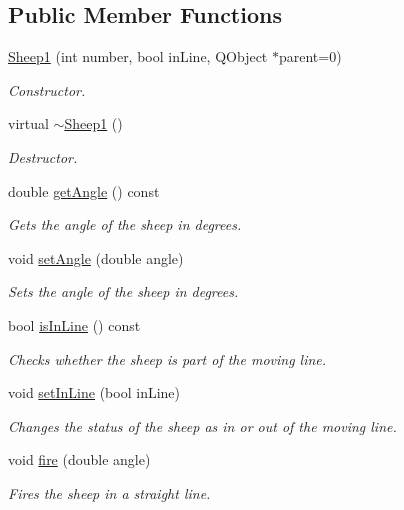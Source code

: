 \subsection*{\-Public \-Member \-Functions}
\begin{DoxyCompactItemize}
\item 
\hyperlink{classSheep1_ac421bb46b209fc0c2a198d91a07ebfff}{\-Sheep1} (int number, bool in\-Line, \-Q\-Object $\ast$parent=0)
\begin{DoxyCompactList}\small\item\em \-Constructor. \end{DoxyCompactList}\item 
virtual \hyperlink{classSheep1_a2622bc6b1343023ec74412b811f6531c}{$\sim$\-Sheep1} ()
\begin{DoxyCompactList}\small\item\em \-Destructor. \end{DoxyCompactList}\item 
double \hyperlink{classSheep1_ab0e6c2a234909380c689e8588d7f6cfb}{get\-Angle} () const 
\begin{DoxyCompactList}\small\item\em \-Gets the angle of the sheep in degrees. \end{DoxyCompactList}\item 
void \hyperlink{classSheep1_a1644fdc3958aa506c792e5bf0e1ec964}{set\-Angle} (double angle)
\begin{DoxyCompactList}\small\item\em \-Sets the angle of the sheep in degrees. \end{DoxyCompactList}\item 
bool \hyperlink{classSheep1_a5bfd6e9f199c39fbc6daa3a679905653}{is\-In\-Line} () const 
\begin{DoxyCompactList}\small\item\em \-Checks whether the sheep is part of the moving line. \end{DoxyCompactList}\item 
void \hyperlink{classSheep1_ad5902cd1b715217e0bff1803c67e7184}{set\-In\-Line} (bool in\-Line)
\begin{DoxyCompactList}\small\item\em \-Changes the status of the sheep as in or out of the moving line. \end{DoxyCompactList}\item 
void \hyperlink{classSheep1_abe21e78851d4df2fc7e989c7f54121fb}{fire} (double angle)
\begin{DoxyCompactList}\small\item\em \-Fires the sheep in a straight line. \end{DoxyCompactList}\item 

\end{DoxyCompactItemize}

